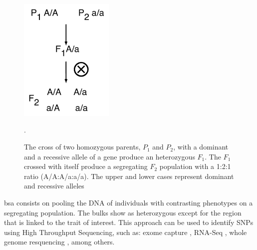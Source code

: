 \begin{figure}
  \centering
    \includegraphics[width=0.4\textwidth]{Yr15/Figures/population/F2schematic.pdf}
  \caption{The cross of two homozygous parents, $P_{1}$ and $P_{2}$, with a dominant and a recessive allele of a gene produce an heterozygous $F_{1}$. The $F_{1}$ crossed with itself produce a segregating $F_{2}$ population with a 1:2:1 ratio (A/A:A/a:a/a). The upper and lower cases represent dominant and recessive alleles  }. 
  \label{fig:yr15:f2schematic}
\end{figure}


\gls{bsa} consists on pooling the DNA of individuals with contrasting phenotypes \citep{Michelmore1991} on a segregating population. 
The bulks show as heterozygous except for the region that is linked to the trait of interest. 
This approach can be used to identify SNPs using High Throughput Sequencing, such as: exome capture \citep{Hodges2007}, RNA-Seq \citep{Pickrell2010}, whole genome resquencing \citep{Schneeberger2009}, among others. 


